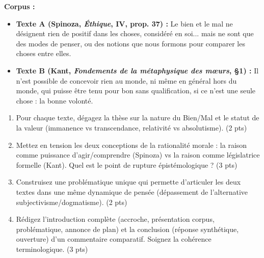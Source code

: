 \documentclass[11pt]{article}
\begin{document}
\begin{exercice}
\textbf{Corpus :} 
\begin{itemize}
    \item \textbf{Texte A (Spinoza, \textit{Éthique}, IV, prop. 37) :} \og Le bien et le mal ne désignent rien de positif dans les choses, considéré en soi... mais ne sont que des modes de penser, ou des notions que nous formons pour comparer les choses entre elles. \fg{}
    \item \textbf{Texte B (Kant, \textit{Fondements de la métaphysique des mœurs}, §1) :} \og Il n'est possible de concevoir rien au monde, ni même en général hors du monde, qui puisse être tenu pour bon sans qualification, si ce n'est une seule chose : la bonne volonté. \fg{}
\end{itemize}
\begin{enumerate}
    \item Pour chaque texte, dégagez la thèse sur la nature du Bien/Mal et le statut de la valeur (immanence vs transcendance, relativité vs absolutisme). (2 pts)
    \item Mettez en tension les deux conceptions de la rationalité morale : la raison comme puissance d'agir/comprendre (Spinoza) vs la raison comme législatrice formelle (Kant). Quel est le point de rupture épistémologique ? (3 pts)
    \item Construisez une problématique unique qui permette d'articuler les deux textes dans une même dynamique de pensée (dépassement de l'alternative subjectivisme/dogmatisme). (2 pts)
    \item Rédigez l'introduction complète (accroche, présentation corpus, problématique, annonce de plan) et la conclusion (réponse synthétique, ouverture) d'un commentaire comparatif. Soignez la cohérence terminologique. (3 pts)
\end{enumerate}
\end{exercice}
\end{document}
